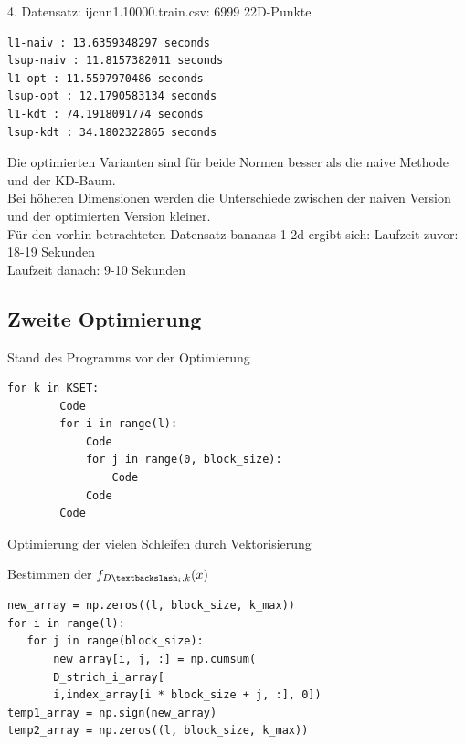 \documentclass{beamer}
\begin{document}
\begin{frame}[fragile]
4. Datensatz: ijcnn1.10000.train.csv: 6999 
22D-Punkte
\begin{verbatim}
l1-naiv : 13.6359348297 seconds
lsup-naiv : 11.8157382011 seconds
l1-opt : 11.5597970486 seconds
lsup-opt : 12.1790583134 seconds
l1-kdt : 74.1918091774 seconds
lsup-kdt : 34.1802322865 seconds
\end{verbatim}
\end{frame}


\begin{frame}
Die optimierten Varianten sind für beide Normen besser als die naive Methode und der KD-Baum.\\
Bei höheren Dimensionen werden die Unterschiede zwischen der naiven Version und der optimierten Version kleiner.\\

Für den vorhin betrachteten Datensatz bananas-1-2d ergibt sich:
Laufzeit zuvor: 18-19 Sekunden\\
Laufzeit danach: 9-10 Sekunden
\end{frame}

\subsection{Zweite Optimierung}

\begin{frame}[fragile]
Stand des Programms vor der Optimierung
\begin{verbatim}
for k in KSET:
        Code
        for i in range(l):
            Code
            for j in range(0, block_size):
                Code
            Code
        Code
\end{verbatim}
Optimierung der vielen Schleifen durch Vektorisierung
\end{frame}

\begin{frame}[fragile]
Bestimmen der $f_{D \textbackslash _i,k} (x)$
\begin{verbatim}
new_array = np.zeros((l, block_size, k_max))  
for i in range(l):
   for j in range(block_size):
       new_array[i, j, :] = np.cumsum(
       D_strich_i_array[
       i,index_array[i * block_size + j, :], 0])
temp1_array = np.sign(new_array)
temp2_array = np.zeros((l, block_size, k_max))
\end{verbatim}
\end{frame}
\end{document}

